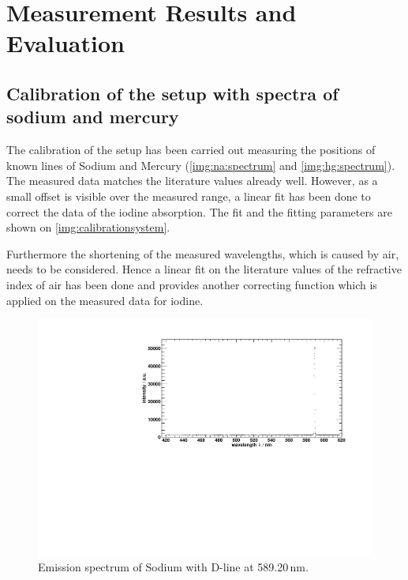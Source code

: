 \section{Measurement Results and Evaluation}

\subsection{Calibration of the setup with spectra of sodium and mercury}


The calibration of the setup has been carried out measuring the positions of known lines of Sodium and Mercury
(\autoref{img:na:spectrum} and \autoref{img:hg:spectrum}).
The measured data matches the literature values already well.
However, as a small offset is visible over the measured range, a linear fit has been done
to correct the data of the iodine absorption.
The fit and the fitting parameters are shown on \autoref{img:calibrationsystem}.

Furthermore the shortening of the measured wavelengths, which is caused by air, needs to be considered.
Hence a linear fit on the literature values of the refractive index of air has been done and provides another
correcting function which is applied on the measured data for iodine.

\begin{figure}[H]
\begin{center}
  \includegraphics[width=\textwidth]{../img/NaPeaks.pdf}
  \caption[---]{Emission spectrum of Sodium with D-line at 589.20\,nm.}
  \label{img:na:spectrum}
\end{center}
\end{figure}

